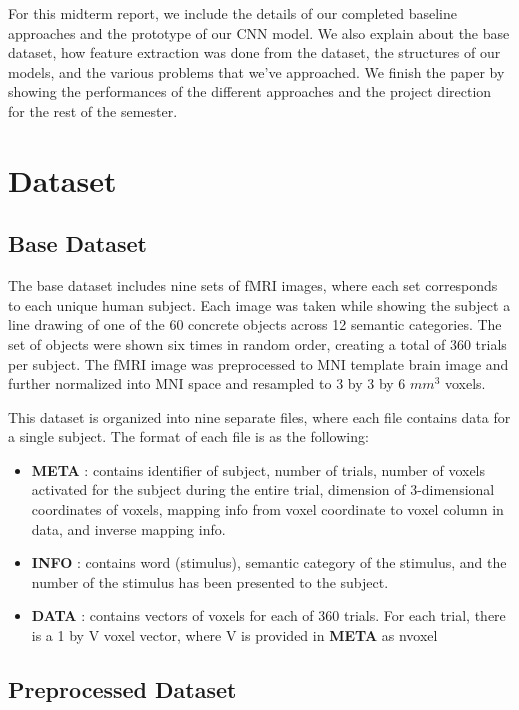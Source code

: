 \documentclass{article} %
\begin{document}
For this midterm report, we include the details of our completed baseline approaches and the prototype of our CNN model. We also explain about the base dataset, how feature extraction was done from the dataset, the structures of our models, and the various problems that we've approached. We finish the paper by showing the performances of the different approaches and the project direction for the rest of the semester.  

\newpage
\section{Dataset}

\subsection{Base Dataset}

The base dataset includes nine sets of fMRI images, where each set corresponds to each unique human subject. Each image was taken while showing the subject a line drawing of one of the 60 concrete objects across 12 semantic categories. The set of objects were shown six times in random order, creating a total of 360 trials per subject.
The fMRI image was preprocessed to MNI template brain image and further normalized into MNI space and resampled to 3 by 3 by 6 $mm^3$ voxels.

This dataset is organized into nine separate files, where each file contains data for a single subject. The format of each file is as the following:
\begin{itemize}
	\item \textbf{META} : contains identifier of subject, number of trials, number of voxels activated for the subject during the entire trial, dimension of 3-dimensional coordinates of voxels, mapping info from voxel coordinate to voxel column in data, and inverse mapping info. 
	\item \textbf{INFO} : contains word (stimulus), semantic category of the stimulus, and the number of the stimulus has been presented to the subject.
	\item \textbf{DATA} : contains vectors of voxels for each of 360 trials. For each trial, there is a 1 by V voxel vector, where V is provided in \textbf{META} as nvoxel
\end{itemize}

\subsection{Preprocessed Dataset}
\end{document}
